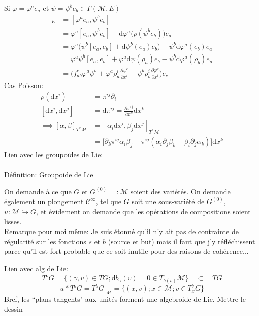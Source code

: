 \documentclass[a4paper,11pt]{article}
\renewcommand{\d}{{\mathrm{d}}}
\newcommand{\dr}[2]{\frac{\partial {#1}}{\partial{#2}}}
\begin{document}
\noindent Si $\varphi = \varphi^a e_a$ et $\psi=\psi^be_b \in \Gamma(\mathcal{M},E)$
\begin{align*}
[\varphi,\psi]_E &= [\varphi^ae_a,\psi^be_b]\\
&= \varphi^a[e_a,\psi^be_b] - \d\varphi^a \Big(\rho(\psi^be_b)\Big)e_a\\
&= \varphi^a\Big(\psi^b[e_a,e_b]+\d\psi^b(e_a)e_b\Big)-\psi^b\d\varphi^a(e_b)e_a\\
&= \varphi^a\psi^b[e_a,e_b] + \varphi^a\d\psi(\rho_a)e_b - \psi^b\d\varphi^a(\rho_b)e_a\\
&=\Big(f^c_{ab}\varphi^a\psi^b + \varphi^a\rho^i_a\dr{\psi^c}{x^i} - \psi^b\rho^i_b \dr{\varphi^c}{x^i}\Big)e_c
\end{align*} 
\underline{Cas Poisson:}
\begin{align*}
\rho(\d x^i) &= \pi^{ij}\partial_i\\
[\d x^i,\d x^j] &= \d \pi^{ij} = \dr{\pi^{ij}}{x^k} \d x^k\\
\implies [\alpha,\beta]_{T^*\mathcal{M}} &= [\alpha_i \d x^i, \beta_j \d x^j]_{T^*\mathcal M}\\
&= \Big[\partial_k \pi^{ij}\alpha_i\beta_j + \pi^{ij}(\alpha_i\partial_j\beta_k - \beta_i \partial_j \alpha_k)\Big]\d x^k
\end{align*}
\underline{Lien avec les groupoïdes de Lie:}\\ \\
\underline{Définition:} Groupoide de Lie

On demande à ce que $G$ et $G^{(0)}=:\mathcal{M}$ soient des variétés. On demande également un plongement $\mathcal{C}^\infty$, tel que $G$ soit une sous-variété de $G^{(0)}$, $u: \mathcal{M}\hookrightarrow G$, et évidement on demande que les opérations de compositions soient lisses.\\
\color{red}Remarque pour moi même: Je suis étonné qu'il n'y ait pas de contrainte de régularité sur les fonctions $s$ et $b$ (source et but) mais il faut que j'y réfléchissent parce qu'il est fort probable que ce soit inutile pour des raisons de cohérence...\color{black}

\noindent\underline{Lien avec alg de Lie:}
$$T^bG = \Big\{(\gamma,v) \in TG; \d b_\gamma(v)=0\in T_{b(v)}\mathcal{M}\Big\}\quad\subset\quad TG$$
$$u*T^bG = T^bG|_\mathcal{M} = \Big\{(x,v); x\in \mathcal{M}; v\in T_x ^b G\Big\}$$
Bref, les ``plans tangents" aux unités forment une algebroide de Lie. \color{red} Mettre le dessin \color{black}\\
\end{document}
